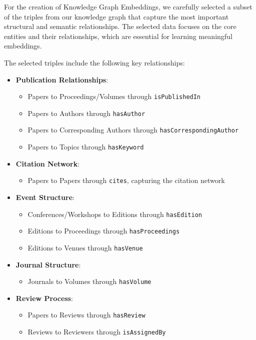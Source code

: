 \documentclass[10pt,a4paper]{article}
\begin{document}
For the creation of Knowledge Graph Embeddings, we carefully selected a subset of the triples from our knowledge graph that capture the most important structural and semantic relationships. The selected data focuses on the core entities and their relationships, which are essential for learning meaningful embeddings.

The selected triples include the following key relationships:

\begin{itemize}
    \item \textbf{Publication Relationships}:
    \begin{itemize}
        \item Papers to Proceedings/Volumes through \texttt{isPublishedIn}
        \item Papers to Authors through \texttt{hasAuthor}
        \item Papers to Corresponding Authors through \texttt{hasCorrespondingAuthor}
        \item Papers to Topics through \texttt{hasKeyword}
    \end{itemize}
    
    \item \textbf{Citation Network}:
    \begin{itemize}
        \item Papers to Papers through \texttt{cites}, capturing the citation network
    \end{itemize}
    
    \item \textbf{Event Structure}:
    \begin{itemize}
        \item Conferences/Workshops to Editions through \texttt{hasEdition}
        \item Editions to Proceedings through \texttt{hasProceedings}
        \item Editions to Venues through \texttt{hasVenue}
    \end{itemize}
    
    \item \textbf{Journal Structure}:
    \begin{itemize}
        \item Journals to Volumes through \texttt{hasVolume}
    \end{itemize}
    
    \item \textbf{Review Process}:
    \begin{itemize}
        \item Papers to Reviews through \texttt{hasReview}
        \item Reviews to Reviewers through \texttt{isAssignedBy}
    \end{itemize}
\end{itemize}
\end{document}
